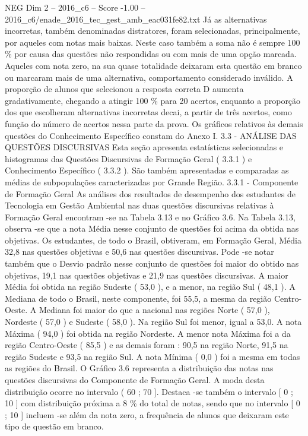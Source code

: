 \begin{textsample}{NEG Dim 2 – 2016\_c6 – Score -1.00 – 2016\_c6/enade\_2016\_tec\_gest\_amb\_eac031fe82.txt}
Já as alternativas incorretas, também denominadas distratores, foram selecionadas, principalmente, por aqueles com notas mais baixas.
Neste caso também a soma não é sempre 100 \% por causa das questões não respondidas ou com mais de uma opção marcada.
Aqueles com nota zero, na sua quase totalidade deixaram esta questão em branco ou marcaram mais de uma alternativa, comportamento considerado inválido.
A proporção de alunos que selecionou a resposta correta D aumenta gradativamente, chegando a atingir 100 \% para 20 acertos, enquanto a proporção dos que escolheram alternativas incorretas decai, a partir de três acertos, como função do número de acertos nessa parte da prova.
Os gráficos relativos às demais questões do Conhecimento Específico constam do Anexo I. 3.3 - ANÁLISE DAS QUESTÕES DISCURSIVAS Esta seção apresenta estatísticas selecionadas e histogramas das Questões Discursivas de Formação Geral ( 3.3.1 ) e Conhecimento Específico ( 3.3.2 ).
São também apresentadas e comparadas as médias de subpopulações caracterizadas por Grande Região. 3.3.1 - Componente de Formação Geral As análises dos resultados de desempenho dos estudantes de Tecnologia em Gestão Ambiental nas duas questões discursivas relativas à Formação Geral encontram -se na Tabela 3.13 e no Gráfico 3.6.
Na Tabela 3.13, observa -se que a nota Média nesse conjunto de questões foi acima da obtida nas objetivas.
Os estudantes, de todo o Brasil, obtiveram, em Formação Geral, Média 32,8 nas questões objetivas e 50,6 nas questões discursivas.
Pode -se notar também que o Desvio padrão nesse conjunto de questões foi maior do obtido nas objetivas, 19,1 nas questões objetivas e 21,9 nas questões discursivas.
A maior Média foi obtida na região Sudeste ( 53,0 ), e a menor, na região Sul ( 48,1 ).
A Mediana de todo o Brasil, neste componente, foi 55,5, a mesma da região Centro-Oeste.
A Mediana foi maior do que a nacional nas regiões Norte ( 57,0 ), Nordeste ( 57,0 ) e Sudeste ( 58,0 ).
Na região Sul foi menor, igual a 53,0.
A nota Máxima ( 94,0 ) foi obtida na região Nordeste.
A menor nota Máxima foi a da região Centro-Oeste ( 85,5 ) e as demais foram : 90,5 na região Norte, 91,5 na região Sudeste e 93,5 na região Sul.
A nota Mínima ( 0,0 ) foi a mesma em todas as regiões do Brasil.
O Gráfico 3.6 representa a distribuição das notas nas questões discursivas do Componente de Formação Geral.
A moda desta distribuição ocorre no intervalo ( 60 ; 70 ].
Destaca -se também o intervalo [ 0 ; 10 ] com distribuição próxima a 8 \% do total de notas, sendo que no intervalo [ 0 ; 10 ] incluem -se além da nota zero, a frequência de alunos que deixaram este tipo de questão em branco.

\end{textsample}
